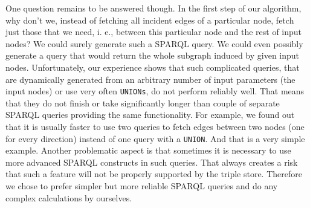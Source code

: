 One question remains to be answered though. In the first step of our algorithm, why don’t we, instead of fetching all incident edges of a particular node, fetch just those that we need, i. e., between this particular node and the rest of input nodes? We could surely generate such a SPARQL query. We could even possibly generate a query that would return the whole subgraph induced by given input nodes. Unfortunately, our experience shows that such complicated queries, that are dynamically generated from an arbitrary number of input parameters (the input nodes) or use very often \texttt{UNIONs}, do not perform reliably well. That means that they do not finish or take significantly longer than couple of separate SPARQL queries providing the same functionality. For example, we found out that it is usually faster to use two queries to fetch edges between two nodes (one for every direction) instead of one query with a \texttt{UNION}. And that is a very simple example. Another problematic aspect is that sometimes it is necessary to use more advanced SPARQL constructs in such queries. That always creates a risk that such a feature will not be properly supported by the triple store. Therefore we chose to prefer simpler but more reliable SPARQL queries and do any complex calculations by ourselves.










